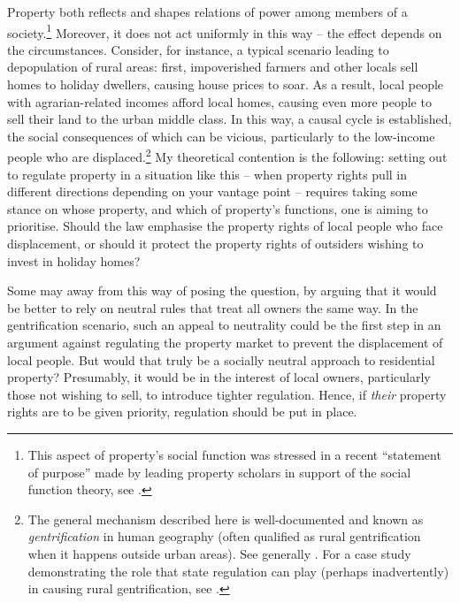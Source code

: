 Property both reflects and shapes relations of power among members of a society.\footnote{This aspect of property's social function was stressed in a recent ``statement of purpose'' made by leading property scholars in support of the social function theory, see \cite{alexander09a}.} Moreover, it does not act uniformly in this way -- the effect depends on the circumstances.  Consider, for instance, a typical scenario leading to depopulation of rural areas: first, impoverished farmers and other locals sell homes to holiday dwellers, causing house prices to soar. As a result, local people with agrarian-related incomes  afford local homes, causing even more people to sell their land to the urban middle class. In this way, a causal cycle is established, the social consequences of which can be vicious, particularly to the low-income people who are displaced.\footnote{The general mechanism described here is well-documented and known as {\it gentrification} in human geography (often qualified as rural gentrification when it happens outside urban areas). See generally \cite{weesep94,phillips93,slater06}. For a case study demonstrating the role that state regulation can play (perhaps inadvertently) in causing rural gentrification, see \cite[1027-1030]{darling05}.} My theoretical contention is the following: setting out to regulate property in a situation like this -- when property rights pull in different directions depending on your vantage point -- requires taking some stance on whose property, and which of property's functions, one is aiming to prioritise. Should the law emphasise the property rights of local people who face displacement, or should it protect the property rights of outsiders wishing to invest in holiday homes? 

Some may  away from this way of posing the question, by arguing that it would be better to rely on neutral rules that treat all owners the same way. In the gentrification scenario, such an appeal to neutrality could be the first step in an argument against regulating the property market to prevent the displacement of local people. But would that truly be a socially neutral approach to residential property? Presumably, it would be in the interest of local owners, particularly those not wishing to sell, to introduce tighter regulation. Hence, if {\it their} property rights are to be given priority, regulation should be put in place.

